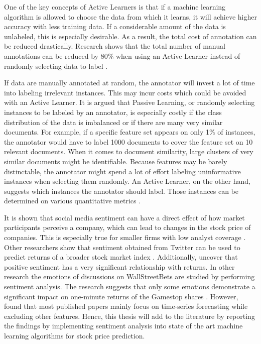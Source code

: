 \documentclass[11pt, a4paper]{article}
\begin{document}
One of the key concepts of Active Learners is that if a machine learning algorithm is allowed to choose the data from which it learns, 
it will achieve higher accuracy with less training data. If a considerable amount of the data is unlabeled, this is especially desirable. 
As a result, the total cost of annotation can be reduced drastically. Research shows that the total number of 
manual annotations can be reduced by 80\% when using an Active Learner instead of randomly 
selecting data to label \citep{baldridgeosborne2004active}.

If data are manually annotated at random, the annotator will invest a lot of time into labeling irrelevant instances. 
This may incur costs which could be avoided with an Active Learner. It is argued that Passive Learning, or randomly selecting instances 
to be labeled by an annotator, is especially costly if the class distribution of the data is imbalanced or if there are many very similar documents. 
For example, if a specific feature set appears on only 1\% of instances, the annotator would have to label 1000 documents to cover 
the feature set on 10 relevant documents. When it comes to document similarity, large clusters of very similar documents might be 
identifiable. Because features may be barely distinctable, the annotator might spend a lot of effort labeling uninformative instances 
when selecting them randomly. An Active Learner, on the other hand, suggests which instances the annotator should label. Those instances can be 
determined on various quantitative metrics \citep{miller2020activelearningapproaches}.

It is shown that social media sentiment can have a 
direct effect of how market participants perceive a company, which can lead to changes in the stock price of companies. This is especially true for smaller 
firms with low analyst coverage \citep{feng2019824}. Other researchers show that sentiment obtained from Twitter can be used to predict returns of a 
broader stock market index \citep{gu2020twtrsentiment}.
Additionally, \cite{werner2004talknoise} uncover that positive sentiment has a very significant relationship with returns.
In other research the emotions of discussions on WallStreetBets are studied by performing sentiment analysis. 
The research suggests that only some emotions demonstrate a significant impact on one-minute returns of the Gamestop shares \citep{long2021LikeTheStock}.
However, \cite{gooijer2006forecasting} found that most published papers mainly focus on time-series forecasting while excluding other features.
Hence, this thesis will add to the literature by reporting the findings by implementing sentiment analysis into state of the art machine learning algorithms for
stock price prediction.
\end{document}
